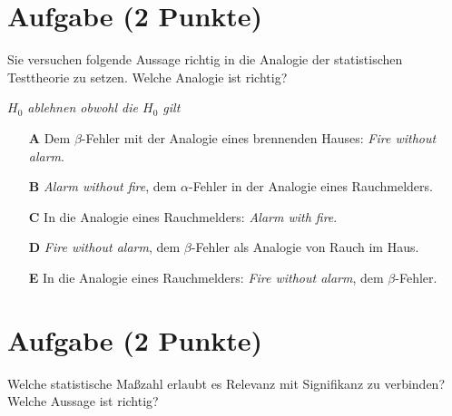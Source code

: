 \documentclass[a4paper, 9pt]{scrartcl}\usepackage[]{graphicx}\usepackage[]{xcolor}
\begin{document}

\section{Aufgabe \hfill (2 Punkte)}



Sie versuchen folgende Aussage richtig in die Analogie der statistischen Testtheorie zu setzen. Welche Analogie ist richtig?

\begin{center}
\textit{$H_0$ ablehnen obwohl die $H_0$ gilt}
\end{center}



\begin{enumerate}
\item [\textbf{A} \msquare] Dem $\beta$-Fehler mit der Analogie eines brennenden Hauses: \textit{Fire without alarm}.
\item [\textbf{B} \msquare] \textit{Alarm without fire}, dem $\alpha$-Fehler in der Analogie eines Rauchmelders.
\item [\textbf{C} \msquare] In die Analogie eines Rauchmelders: \textit{Alarm with fire}.
\item [\textbf{D} \msquare] \textit{Fire without alarm}, dem $\beta$-Fehler als Analogie von Rauch im Haus.
\item [\textbf{E} \msquare] In die Analogie eines Rauchmelders: \textit{Fire without alarm}, dem $\beta$-Fehler.
\end{enumerate}

\section{Aufgabe \hfill (2 Punkte)}



Welche statistische Maßzahl erlaubt es Relevanz mit Signifikanz zu verbinden? Welche Aussage ist richtig?
\end{document}
